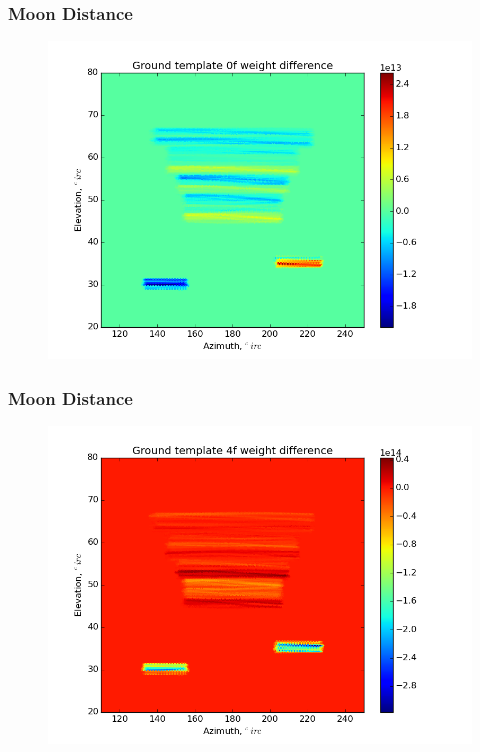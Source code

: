 \documentclass{beamer}
\begin{document}
\begin{frame}
\frametitle{Moon Distance}
\begin{figure}
\includegraphics[width=0.9\linewidth]{dw0_gt_MOON_DIST.png}
\end{figure}
\end{frame}

\begin{frame}
\frametitle{Moon Distance}
\begin{figure}
\includegraphics[width=0.9\linewidth]{dw4_gt_MOON_DIST.png}
\end{figure}
\end{frame}
\end{document}
